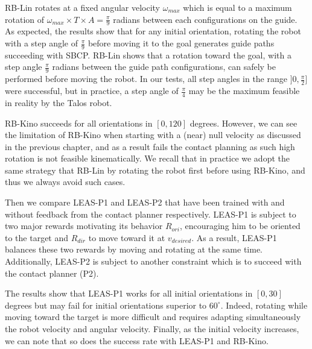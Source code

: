 RB-Lin rotates at a fixed angular velocity $\omega_{max}$ which is equal to a maximum rotation of $\omega_{max} \times T \times A = \frac{\pi}{9}$ radians between each configurations on the guide. As expected, the results show that for any initial orientation, rotating the robot with a step angle of $\frac{\pi}{9}$ before moving it to the goal generates guide paths succeeding with SBCP. 
RB-Lin shows that a rotation toward the goal, with a step angle $\frac{\pi}{9}$ radians between the guide path configurations, can safely be performed before moving the robot. 
In our tests, all step angles in the range $]0,\frac{\pi}{2}]$ were successful, but in practice, a step angle of $\frac{\pi}{4}$ may be the maximum feasible in reality by the Talos robot.

RB-Kino succeeds for all orientations in $[0,120]$ degrees. 
However, we can see the limitation of RB-Kino when starting with a (near) null velocity as discussed in the previous chapter, and as a result fails the contact planning as such high rotation is not feasible kinematically. 
We recall that in practice we adopt the same strategy that RB-Lin by rotating the robot first before using RB-Kino, and thus we always avoid such cases.

Then we compare LEAS-P1 and LEAS-P2 that have been trained with and without feedback from the contact planner respectively.
LEAS-P1 is subject to two major rewards motivating its behavior $R_{ori}$, encouraging him to be oriented to the target and $R_{dir}$ to move toward it at $v_{desired}$. 
As a result, LEAS-P1 balances these two rewards by moving and rotating at the same time. 
Additionally, LEAS-P2 is subject to another constraint which is to succeed with the contact planner (P2).

The results show that LEAS-P1 works for all initial orientations in $[0,30]$ degrees but may fail for initial orientations superior to $60^{\circ}$.
Indeed, rotating while moving toward the target is more difficult and requires adapting simultaneously the robot velocity and angular velocity.
Finally, as the initial velocity increases, we can note that so does the success rate with LEAS-P1 and RB-Kino.

